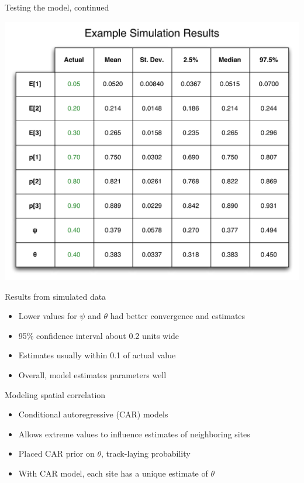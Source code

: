 \documentclass{beamer}
\begin{document}
\begin{frame}{Testing the model, continued}
	\begin{center}
	\includegraphics[scale=0.5]{../SimulatedData.pdf}
	\end{center}
\end{frame}

\begin{frame}{Results from simulated data}
	\begin{itemize}
		\item Lower values for $\psi$ and $\theta$ had better convergence and
		estimates
		\item 95\% confidence interval about 0.2 units wide
		\item Estimates usually within 0.1 of actual value
		\item Overall, model estimates parameters well
	\end{itemize}
\end{frame}

\begin{frame}{Modeling spatial correlation}
	\begin{itemize}
		\item Conditional autoregressive (CAR) models
		\item Allows extreme values to influence estimates of neighboring sites
		\item Placed CAR prior on $\theta$, track-laying probability
		\item With CAR model, each site has a unique estimate of $\theta$
	\end{itemize}
\end{frame}
\end{document}
